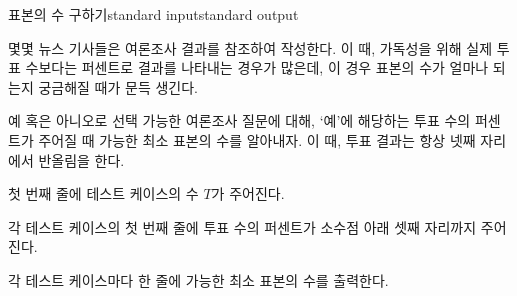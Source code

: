 \begin{problem}{표본의 수 구하기}{standard input}{standard output}

몇몇 뉴스 기사들은 여론조사 결과를 참조하여 작성한다. 이 때, 가독성을 위해 실제 투표 수보다는 퍼센트로 결과를 나타내는 경우가 많은데, 이 경우 표본의 수가 얼마나 되는지 궁금해질 때가 문득 생긴다.

예 혹은 아니오로 선택 가능한 여론조사 질문에 대해, ‘예’에 해당하는 투표 수의 퍼센트가 주어질 때 가능한 최소 표본의 수를 알아내자. 이 때, 투표 결과는 항상 넷째 자리에서 반올림을 한다.

\InputFile
첫 번째 줄에 테스트 케이스의 수 $T$가 주어진다.

각 테스트 케이스의 첫 번째 줄에 투표 수의 퍼센트가 소수점 아래 셋째 자리까지 주어진다. 

\OutputFile
각 테스트 케이스마다 한 줄에 가능한 최소 표본의 수를 출력한다.

\Example

\begin{example}
%
\end{example}

\end{problem}
